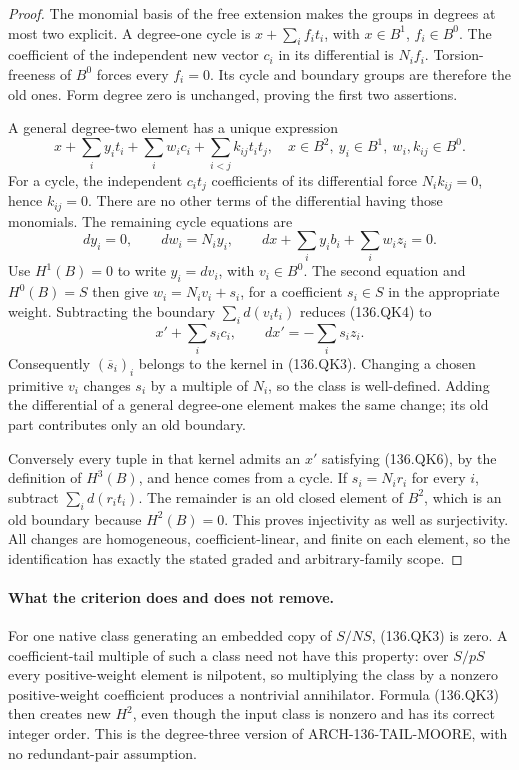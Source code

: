\begin{proof}
The monomial basis of the free extension makes the groups in
degrees at most two explicit. A degree-one cycle is
\(x+\sum_i f_i t_i\), with \(x\in B^1\), \(f_i\in B^0\).
The coefficient of the independent new vector \(c_i\) in its
differential is \(N_i f_i\). Torsion-freeness of \(B^0\)
forces every \(f_i=0\). Its cycle and boundary groups are
therefore the old ones. Form degree zero is unchanged, proving
the first two assertions.

A general degree-two element has a unique expression
\[
 x+\sum_i y_i t_i+\sum_i w_i c_i
                      +\sum_{i<j}k_{ij}t_it_j,
 \quad x\in B^2,\ y_i\in B^1,\ w_i,k_{ij}\in B^0.
                                                               \tag{136.QK4}
\]
For a cycle, the independent \(c_i t_j\) coefficients of
its differential force \(N_i k_{ij}=0\), hence
\(k_{ij}=0\). There are no other terms of the differential
having those monomials. The remaining cycle equations are
\[
 dy_i=0,\qquad dw_i=N_i y_i,\qquad
             dx+\sum_i y_i b_i+\sum_i w_i z_i=0.          \tag{136.QK5}
\]
Use \(H^1(B)=0\) to write \(y_i=dv_i\), with
\(v_i\in B^0\). The second equation and \(H^0(B)=S\)
then give \(w_i=N_i v_i+s_i\), for a coefficient
\(s_i\in S\) in the appropriate weight. Subtracting the
boundary \(\sum_i d(v_i t_i)\) reduces (136.QK4) to
\[
                     x'+\sum_i s_i c_i,
                 \qquad dx'=-\sum_i s_i z_i.             \tag{136.QK6}
\]
Consequently \((\overline s_i)_i\) belongs to the kernel
in (136.QK3). Changing a chosen primitive \(v_i\) changes
\(s_i\) by a multiple of \(N_i\), so the class is
well-defined. Adding the differential of a general degree-one
element makes the same change; its old part contributes only
an old boundary.

Conversely every tuple in that kernel admits an \(x'\)
satisfying (136.QK6), by the definition of \(H^3(B)\), and
hence comes from a cycle. If \(s_i=N_i r_i\) for every
\(i\), subtract \(\sum_i d(r_i t_i)\). The remainder is
an old closed element of \(B^2\), which is an old boundary
because \(H^2(B)=0\). This proves injectivity as well as
surjectivity. All changes are homogeneous, coefficient-linear,
and finite on each element, so the identification has exactly
the stated graded and arbitrary-family scope.
\end{proof}

\paragraph{What the criterion does and does not remove.}
For one native class generating an embedded copy of
\(S/NS\), (136.QK3) is zero. A coefficient-tail multiple of
such a class need not have this property: over \(S/pS\)
every positive-weight element is nilpotent, so multiplying the
class by a nonzero positive-weight coefficient produces a
nontrivial annihilator. Formula (136.QK3) then creates new
\(H^2\), even though the input class is nonzero and has its
correct integer order. This is the degree-three version of
ARCH-136-TAIL-MOORE, with no redundant-pair assumption.

